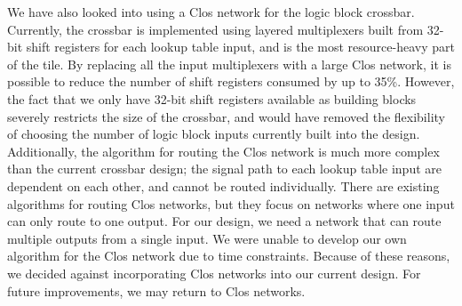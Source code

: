 We have also looked into using a Clos network for the logic block crossbar.
Currently, the crossbar is implemented using layered multiplexers built from 32-bit shift registers for each lookup table input, and is the most resource-heavy part of the tile.
By replacing all the input multiplexers with a large Clos network, it is possible to reduce the number of shift registers consumed by up to 35\%.
However, the fact that we only have 32-bit shift registers available as building blocks severely restricts the size of the crossbar, and would have removed the flexibility of choosing the number of logic block inputs currently built into the design.
Additionally, the algorithm for routing the Clos network is much more complex than the current crossbar design; the signal path to each lookup table input are dependent on each other, and cannot be routed individually.
There are existing algorithms for routing Clos networks, but they focus on networks where one input can only route to one output.
For our design, we need a network that can route multiple outputs from a single input.
We were unable to develop our own algorithm for the Clos network due to time constraints.
Because of these reasons, we decided against incorporating Clos networks into our current design.
For future improvements, we may return to Clos networks.


